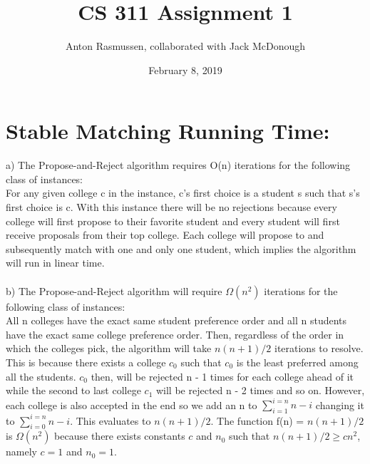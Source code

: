 \documentclass{article}
\title{CS 311 Assignment 1}
\author{Anton Rasmussen, collaborated with Jack McDonough}
\date{February 8, 2019}
\begin{document}
\maketitle

\section{Stable Matching Running Time:}
a) The Propose-and-Reject algorithm requires O(n) iterations for the following class of instances:\\ For any given college c in the instance, c's first choice is a student s such that s's first choice is c. With this instance there will be no rejections because every college will first propose to their favorite student and every student will first receive proposals from their top college. Each college will propose to and subsequently match with one and only one student, which implies the algorithm will run in linear time.\\\\
b) The Propose-and-Reject algorithm will require $\Omega(n^2)$ iterations for the following class of instances:\\ All n colleges have the exact same student preference order and all n students have the exact same college preference order. Then, regardless of the order in which the colleges pick, the algorithm will take $n(n + 1)/2$ iterations to resolve. This is because there exists a college $c_0$ such that $c_0$ is the least preferred among all the students. $c_0$ then, will be rejected n - 1 times for each college ahead of it while the second to last college $c_1$ will be rejected n - 2 times and so on. However, each college is also accepted in the end so we add an n to $\sum_{i = 1}^{i = n} n - i$ changing it to $\sum_{i = 0}^{i = n} n - i$. This evaluates to $n(n + 1)/2$. The function f(n) = $n(n + 1)/2$ is $\Omega(n^2)$ because there exists constants $c$ and $n_0$ such that $n(n + 1)/2 \geq cn^2$, namely $c = 1$ and $n_0 = 1$.
\end{document}
